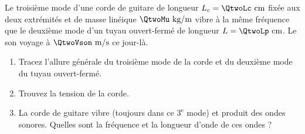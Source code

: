 
Le troisième mode d'une corde de guitare de longueur $L_c = \QtwoLc\text{ cm}$ fixée aux deux extrémités et de masse linéique $\QtwoMu\text{ kg/m}$ vibre à la même fréquence que le deuxième mode d'un tuyau ouvert-fermé de longueur $L = \QtwoLp\text{ cm}$. Le son voyage à $\QtwoVson\text{ m/s}$ ce jour-là.

\begin{enumerate}[label=\alph*)]
    \item Tracez l'allure générale du troisième mode de la corde et du deuxième mode du tuyau ouvert-fermé.
    \item Trouvez la tension de la corde.
    \item La corde de guitare vibre (toujours dans ce $3^\text{e}$ mode) et produit des ondes sonores. Quelles sont la fréquence et la longueur d'onde de ces ondes ?
\end{enumerate}